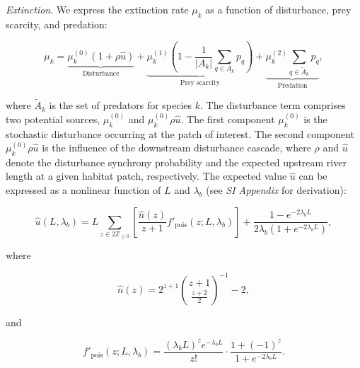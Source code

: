 \documentclass[11pt, class=article, crop=false]{standalone}
\begin{document}
\textit{Extinction}. We express the extinction rate $\mu_k$ as a function of disturbance, prey scarcity, and predation:

\begin{equation}
    \mu_{k} = 
        \underbrace{\mu_{k}^{(0)} (1 + \rho \hat{u})}_{\text{Disturbance}} + 
        \underbrace{\mu_{k}^{(1)} \left(1 - \frac{1}{|A_{k}|}\sum_{q\in A_{k}} p_{q}\right)}_{\text{Prey scarcity}} + 
        \underbrace{\mu_{k}^{(2)} \sum_{q \in \tilde{A}_{k}} p_{q}}_{\text{Predation}},
    \label{eq:extn}    
\end{equation}

where $\tilde{A}_{k}$ is the set of predators for species $k$.
The disturbance term comprises two potential sources, $\mu^{(0)}_k$ and $\mu^{(0)}_k \rho \hat{u}$.
The first component $\mu^{(0)}_k$ is the stochastic disturbance occurring at the patch of interest.
The second component $\mu^{(0)}_k \rho \hat{u}$ is the influence of the downstream disturbance cascade, where $\rho$ and $\hat{u}$ denote the disturbance synchrony probability and the expected upstream river length at a given habitat patch, respectively.
The expected value $\hat{u}$ can be expressed as a nonlinear function of $L$ and $\lambda_b$ (see \textit{SI Appendix} for derivation):

\begin{equation}
    \hat{u}(L, \lambda_b) = L \sum_{z \in 2\mathbb{Z}_{\ge 0}} \left[ \frac{\hat{n}(z)}{z + 1} f'_{\text{pois}}(z; L, \lambda_b)\right] + \frac{1 - e^{-2 \lambda_b L}}{2 \lambda_b (1 + e^{-2 \lambda_b L})},
\end{equation}

where

\begin{equation}
    \hat{n}(z) = 2^{z + 1} \binom{z + 1}{\frac{z + 2}{2}}^{-1} - 2,
\end{equation}

and

\begin{equation}
    f'_{\text{pois}}(z; L, \lambda_b) = \frac{(\lambda_b L)^z e^{-\lambda_b L}}{z!} \cdot \frac{1 + (-1)^{z}}{1 + e^{-2\lambda_b L}}.
\end{equation}
\end{document}
